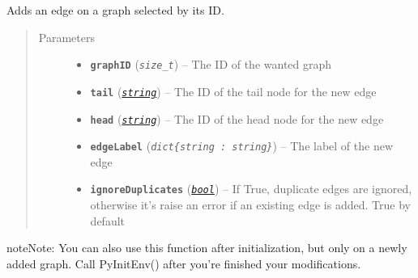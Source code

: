 \documentclass[letterpaper,10pt,english]{sphinxmanual}
\begin{document}
\begin{fulllineitems}
\label{doc:PythonGedLib.PyAddEdge}
Adds an edge on a graph selected by its ID.
\begin{quote}\begin{description}
\item[{Parameters}] \leavevmode\begin{itemize}
\item {} 
\textbf{\texttt{graphID}} (\emph{\texttt{size\_t}}) -- The ID of the wanted graph

\item {} 
\textbf{\texttt{tail}} (\href{https://docs.python.org/3/library/string.html\#module-string}{\emph{\texttt{string}}}) -- The ID of the tail node for the new edge

\item {} 
\textbf{\texttt{head}} (\href{https://docs.python.org/3/library/string.html\#module-string}{\emph{\texttt{string}}}) -- The ID of the head node for the new edge

\item {} 
\textbf{\texttt{edgeLabel}} (\emph{\texttt{dict\{string : string\}}}) -- The label of the new edge

\item {} 
\textbf{\texttt{ignoreDuplicates}} (\href{https://docs.python.org/3/library/functions.html\#bool}{\emph{\texttt{bool}}}) -- If True, duplicate edges are ignored, otherwise it's raise an error if an existing edge is added. True by default

\end{itemize}

\end{description}\end{quote}

\begin{notice}{note}{Note:}
You can also use this function after initialization, but only on a newly added graph. Call PyInitEnv() after you're finished your modifications.
\end{notice}

\end{fulllineitems}

\end{document}
